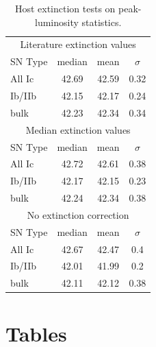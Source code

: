\documentclass[a4paper,fleqn,usenatbib]{mnras}
\begin{document}
\begin{table}
	\centering
	\caption{Host extinction tests on peak-luminosity statistics.}
	\begin{tabular}{lccc}
	\hline
	\multicolumn{4}{c}{Literature extinction values}\\
	SN Type & median & mean & $\sigma$ \\
	\hline
	All Ic & 42.69 & 42.59 & 0.32 \\
	Ib/IIb & 42.15 & 42.17 & 0.24 \\
    bulk & 42.23 & 42.34 & 0.34 \\
    \hline
    \multicolumn{4}{c}{Median extinction values}\\
	SN Type & median & mean & $\sigma$ \\
	\hline
	All Ic & 42.72 & 42.61 & 0.38 \\
	Ib/IIb & 42.17 & 42.15 & 0.23 \\
    bulk & 42.24 & 42.34 & 0.38 \\
    \hline
    \multicolumn{4}{c}{No extinction correction}\\
	SN Type & median & mean & $\sigma$ \\
	\hline
	All Ic & 42.67 & 42.47 & 0.4 \\
	Ib/IIb & 42.01 & 41.99 & 0.2 \\
    bulk & 42.11 & 42.12 & 0.38 \\
    \hline
	\end{tabular}
	\label{comparison}
\end{table}

\section{Tables}
\end{document}
